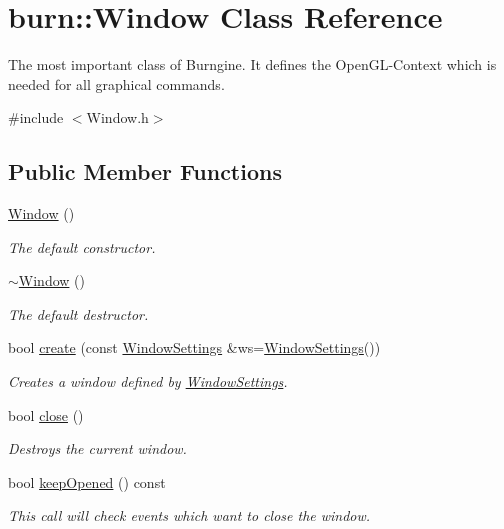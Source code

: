 \hypertarget{classburn_1_1_window}{\section{burn\-:\-:Window Class Reference}
\label{classburn_1_1_window}
}


The most important class of Burngine. It defines the Open\-G\-L-\/\-Context which is needed for all graphical commands.  




{\ttfamily \#include $<$Window.\-h$>$}

\subsection*{Public Member Functions}
\begin{DoxyCompactItemize}
\item 
\hyperlink{classburn_1_1_window_acc7f6464e1ed22854f41342becb51e62}{Window} ()
\begin{DoxyCompactList}\small\item\em The default constructor. \end{DoxyCompactList}\item 
\hyperlink{classburn_1_1_window_a47bd487f48808cab78faa5713e15f0c3}{$\sim$\-Window} ()
\begin{DoxyCompactList}\small\item\em The default destructor. \end{DoxyCompactList}\item 
bool \hyperlink{classburn_1_1_window_a0d37ad863a1c1dd888fa131adcf6c7ec}{create} (const \hyperlink{classburn_1_1_window_settings}{Window\-Settings} \&ws=\hyperlink{classburn_1_1_window_settings}{Window\-Settings}())
\begin{DoxyCompactList}\small\item\em Creates a window defined by \hyperlink{classburn_1_1_window_settings}{Window\-Settings}. \end{DoxyCompactList}\item 
bool \hyperlink{classburn_1_1_window_a1bed3eba8c1da3f0a58a3ed5de2c1071}{close} ()
\begin{DoxyCompactList}\small\item\em Destroys the current window. \end{DoxyCompactList}\item 
bool \hyperlink{classburn_1_1_window_aefd7af7009fee4982b04ac946540f7ee}{keep\-Opened} () const 
\begin{DoxyCompactList}\small\item\em This call will check events which want to close the window. \end{DoxyCompactList}\item 

\end{DoxyCompactItemize}
